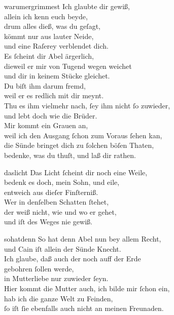 \documentclass[abbrwidth=6em,tocstyle=ref-genre]{ees}
\begin{document}
{\begin{movement}{warumergrimmest}
  \voice[Adam]
  Ich glaubte dir gewiß,\\
  allein ich kenn euch beyde,\\
  drum alles dieß, was du geſagt,\\
  kömmt nur aus lauter Neide,\\
  und eine Raſerey verblendet dich.\\
  Es ſcheint dir Abel ärgerlich,\\
  dieweil er mir von Tugend wegen weichet\\
  und dir in keinem Stücke gleichet.\\
  Du biſt ihm darum fremd,\\
  weil er es redlich mit dir meynt.\\
  Thu es ihm vielmehr nach, ſey ihm nicht ſo zuwieder,\\
  und lebt doch wie die Brüder.\\
  Mir kommt ein Grauen an,\\
  weil ich den Ausgang ſchon zum Voraus ſehen kan,\\
  die Sünde bringet dich zu ſolchen böſen Thaten,\\
  bedenke, was du thuſt, und laß dir rathen.
\end{movement}

\begin{movement}{daslicht}
  \voice[Adam]
  Das Licht ſcheint dir noch eine Weile,\\
  bedenk es doch, mein Sohn, und eile,\\
  entweich aus dieſer Finſterniß.\\
  Wer in denſelben Schatten ſtehet,\\
  der weiß nicht, wie und wo er gehet,\\
  und iſt des Weges nie gewiß.
\end{movement}

\begin{movement}{sohatdenn}
  \voice[Cain]
  So hat denn Abel nun bey allem Recht,\\
  und Cain iſt allein der Sünde Knecht.\\
  Ich glaube, daß auch der noch auff der Erde\\
  gebohren ſollen werde,\\
  in Mutterliebe nur zuwieder ſeyn.\\
  Hier kommt die Mutter auch, ich bilde mir ſchon ein,\\
  hab ich die ganze Welt zu Feinden,\\
  ſo iſt ſie ebenfalls auch nicht an meinen Freunaden.


\end{movement}}
\end{document}

